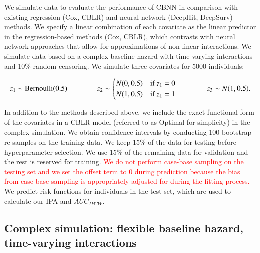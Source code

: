 \documentclass[preprint,12pt,authoryear]{elsarticle}
\begin{document}
We simulate data to evaluate the performance of CBNN in comparison with existing regression (Cox, CBLR) and neural network (DeepHit, DeepSurv) methods. We specify a linear combination of each covariate as the linear predictor in the regression-based methods (Cox, CBLR), which contrasts with neural network approaches that allow for approximations of non-linear interactions. We simulate data based on a complex baseline hazard with time-varying interactions and 10\% random censoring. We simulate three covariates for 5000 individuals:


\begin{equation*}
\resizebox{\hsize}{!}{$
z_{1} \sim \textrm{Bernoulli}(0.5) \qquad \qquad %
z_{2} \sim \begin{cases}
 N(0,0.5) & \textrm{if } z_{1}=0\\ 
 N(1,0.5) & \textrm{if } z_{1}=1
\end{cases} \qquad \qquad
z_{3} \sim N(1,0.5).$}
\end{equation*}

In addition to the methods described above, we include the exact functional form of the covariates in a CBLR model (referred to as Optimal for simplicity) in the complex simulation. We obtain confidence intervals by conducting 100 bootstrap re-samples on the training data. We keep 15\% of the data for testing before hyperparameter selection. We use 15\% of the remaining data for validation and the rest is reserved for training. \textcolor{red}{We do not perform case-base sampling on the testing set and we set the offset term to 0 during prediction because the bias from case-base sampling is appropriately adjusted for during the fitting process.} We predict risk functions for individuals in the test set, which are used to calculate our IPA and $AUC_{IPCW}$.

\hypertarget{complex-simulation-flexible-baseline-hazard-time-varying-interactions}{%
\subsection{Complex simulation: flexible baseline hazard, time-varying interactions}\label{complex-simulation-flexible-baseline-hazard-time-varying-interactions}}
\end{document}
